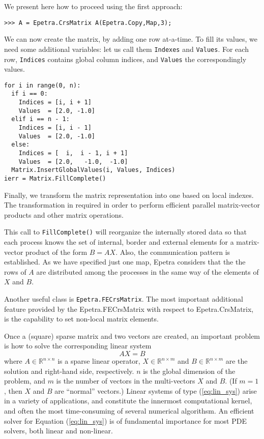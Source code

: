 \documentclass[10pt,relax]{SANDreport}
\begin{document}
We present here how to proceed using the first approach:
\begin{verbatim}
>>> A = Epetra.CrsMatrix A(Epetra.Copy,Map,3);
\end{verbatim}
We can now create the matrix, by adding one row at-a-time.
To fill its values, we
need some additional variables: let us call them \verb!Indexes! and
\verb!Values!. For each row, \verb!Indices! contains global column
indices, and \verb!Values! the correspondingly values.
\begin{verbatim}
for i in range(0, n):
  if i == 0:
    Indices = [i, i + 1]
    Values  = [2.0, -1.0]
  elif i == n - 1:
    Indices = [i, i - 1]
    Values  = [2.0, -1.0]
  else:
    Indices = [  i,  i - 1, i + 1]
    Values  = [2.0,   -1.0,  -1.0]
  Matrix.InsertGlobalValues(i, Values, Indices)
ierr = Matrix.FillComplete()
\end{verbatim}
Finally, we transform the matrix representation into one based on local
indexes. The transformation in required in order to perform efficient parallel
matrix-vector products and other matrix operations.

This call to \verb!FillComplete()! will reorganize the internally stored
data so that each process knows the set of internal, border and external
elements for a matrix-vector product of the form $B = AX$. Also, the
communication pattern is established. As we have specified just one map,
Epetra considers that the the rows of $A$ are distributed among the
processes in the same way of the elements of $X$ and $B$.

Another useful class is {\tt Epetra.FECrsMatrix}.
The most important additional feature provided by the
Epetra.FECrsMatrix with respect to Epetra.CrsMatrix, is the capability
to set non-local matrix elements. 

\smallskip

Once a (square) sparse matrix and two vectors are created, an important
problem is how to solve the corresponding linear system
\begin{equation}
\label{eq:lin_sys}
A X = B
\end{equation}
where $A \in \mathbb{R}^{n \times n}$ is a sparse linear operator, $X \in
\mathbb{R}^{n \times m}$ and $B \in \mathbb{R}^{n \times m}$ are the solution
and right-hand side, respectively. $n$ is the global dimension of the problem,
  and $m$ is the number of vectors in the multi-vectors $X$ and $B$. 
  (If $m = 1$, then $X$ and $B$ are ``normal'' vectors.)
Linear systems of type (\ref{eq:lin_sys}) arise in a variety of applications,
  and constitute the innermost computational kernel, and often the most
  time-consuming of several numerical algorithsm. An efficient solver for
  Equation (\ref{eq:lin_sys}) is of fundamental importance for most PDE
  solvers, both linear and non-linear.
\end{document}
